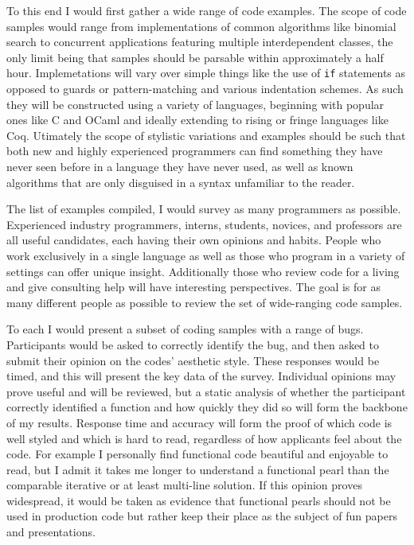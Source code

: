 \documentclass{article}
\begin{document}
To this end I would first gather a wide range of code examples. 
The scope of code samples would range from implementations of common algorithms like binomial search to concurrent applications featuring multiple interdependent classes, the only limit being that samples should be parsable within approximately a half hour.
Implemetations will vary over simple things like the use of \texttt{if} statements as opposed to guards or pattern-matching and various indentation schemes.
As such they will be constructed using a variety of languages, beginning with popular ones like C and OCaml and ideally extending to rising or fringe languages like Coq.
Utimately the scope of stylistic variations and examples should be such that both new and highly experienced programmers can find something they have never seen before in a language they have never used, as well as known algorithms that are only disguised in a syntax unfamiliar to the reader.

The list of examples compiled, I would survey as many programmers as possible. 
Experienced industry programmers, interns, students, novices, and professors are all useful candidates, each having their own opinions and habits.
People who work exclusively in a single language as well as those who program in a variety of settings can offer unique insight. 
Additionally those who review code for a living and give consulting help will have interesting perspectives.
The goal is for as many different people as possible to review the set of wide-ranging code samples.

To each I would present a subset of coding samples with a range of bugs.
Participants would be asked to correctly identify the bug, and then asked to submit their opinion on the codes' aesthetic style.
These responses would be timed, and this will present the key data of the survey.
Individual opinions may prove useful and will be reviewed, but a static analysis of whether the participant correctly identified a function and how quickly they did so will form the backbone of my results.
Response time and accuracy will form the proof of which code is well styled and which is hard to read, regardless of how applicants feel about the code.
For example I personally find functional code beautiful and enjoyable to read, but I admit it takes me longer to understand a functional pearl than the comparable iterative or at least multi-line solution.
If this opinion proves widespread, it would be taken as evidence that functional pearls should not be used in production code but rather keep their place as the subject of fun papers and presentations.
\end{document}
